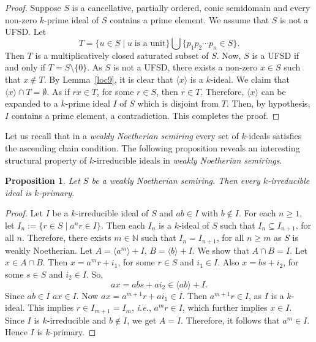 \documentclass[11pt,leqno]{amsart}
\newtheorem{proposition}[theorem]{Proposition}
\theoremstyle{definition}
\numberwithin{equation}{section}
\begin{document}
\begin{proof}
Suppose $S$ is a cancellative, partially ordered, conic semidomain and every non-zero $k$-prime ideal of $S$ contains a prime element. We assume that $S$ is not a UFSD. Let \[T=\{u\in S \mid u \;\text{is a unit} \} \bigcup \{p_1p_2\cdots p_n\in S\}.\] Then $T$ is a multiplicatively closed saturated subset of $S$. Now, $S$ is a UFSD if and only if $T=S\setminus \{0\}$. As $S$ is not a UFSD, there exists a non-zero $x\in S$ such that $x\notin T$. By Lemma~\ref{loc9}, it is clear that $\langle x\rangle$ is a $k$-ideal. We claim that $\langle x\rangle \cap T=\emptyset$. As if $rx\in T$, for some $r\in S$, then $r\in T$. Therefore, $\langle x \rangle$ can be expanded to a $k$-prime ideal $I$ of $S$ which is disjoint from $T$. Then, by hypothesis, $I$ contains a prime element, a contradiction. This completes the proof.
\end{proof}

Let us recall that in a \emph{weakly Noetherian semiring} every set of $k$-ideals satisfies the ascending chain condition. The following proposition reveals an interesting structural property of $k$-irreducible ideals in \emph{weakly Noetherian semirings}. 

\begin{proposition}\label{weakly Noetherian semiring, every k-irreducible ideal is k-primary}
    Let $S$ be a weakly Noetherian semiring. Then every $k$-irreducible ideal is $k$-primary.
\end{proposition}

\begin{proof}
    Let $I$ be a $k$-irreducible ideal of $S$ and $ab\in I$ with $b\notin I$. For each $n\geqslant 1$, let $I_n:=\{r\in S \mid a^nr\in I\}$. Then each $I_n$ is a $k$-ideal of $S$ such that $I_n\subseteq I_{n+1}$, for all $n$. Therefore, there exists $m\in \mathds{N}$ such that $I_n=I_{n+1}$, for all $n\geqslant m$ as $S$ is weakly Noetherian. Let $A=\langle a^m\rangle+I$, $B=\langle b \rangle+I$. We show that $A\cap B=I$. Let $x\in A\cap B$. Then $x=a^mr+i_1$, for some $r\in S$ and $i_1\in I$. Also $x=bs+i_2$, for some $s\in S$ and $i_2\in I$. So, $$ax=abs+ai_2\in \langle ab \rangle+I.$$ Since $ab\in I$ $ax\in I$. Now $ax=a^{m+1}r+ai_1\in I$. Then $a^{m+1}r\in I$, as $I$ is a $k$-ideal. This implies $r\in I_{m+1}=I_m$, \textit{i.e.}, $a^mr\in I$, which further implies $x\in I$. Since $I$ is $k$-irreducible and $b\notin I$, we get $A=I$. Therefore, it follows that $a^m\in I$. Hence $I$ is $k$-primary.
\end{proof}
\end{document}
